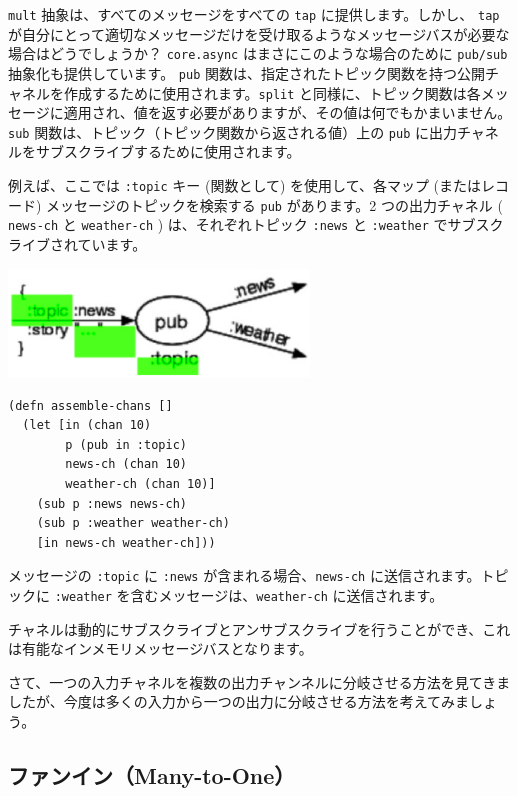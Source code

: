 \texttt{mult} 抽象は、すべてのメッセージをすべての \texttt{tap} に提供します。しかし、 \texttt{tap} が自分にとって適切なメッセージだけを受け取るようなメッセージバスが必要な場合はどうでしょうか？ \texttt{core.async} はまさにこのような場合のために \texttt{pub/sub} 抽象化も提供しています。 \texttt{pub} 関数は、指定されたトピック関数を持つ公開チャネルを作成するために使用されます。\texttt{split} と同様に、トピック関数は各メッセージに適用され、値を返す必要がありますが、その値は何でもかまいません。 \texttt{sub} 関数は、トピック（トピック関数から返される値）上の \texttt{pub} に出力チャネルをサブスクライブするために使用されます。

例えば、ここでは \texttt{:topic} キー (関数として) を使用して、各マップ (またはレコード) メッセージのトピックを検索する \texttt{pub} があります。2 つの出力チャネル ( \texttt{news-ch} と \texttt{weather-ch} ) は、それぞれトピック \texttt{:news} と \texttt{:weather} でサブスクライブされています。

\includegraphics[width=8cm]{fig_06_005.eps}

\begin{lstlisting}[numbers=none]
(defn assemble-chans []
  (let [in (chan 10)
        p (pub in :topic)
        news-ch (chan 10)
        weather-ch (chan 10)]
    (sub p :news news-ch)
    (sub p :weather weather-ch)
    [in news-ch weather-ch]))
\end{lstlisting}

メッセージの \texttt{:topic} に \texttt{:news} が含まれる場合、\texttt{news-ch} に送信されます。トピックに \texttt{:weather} を含むメッセージは、\texttt{weather-ch} に送信されます。

チャネルは動的にサブスクライブとアンサブスクライブを行うことができ、これは有能なインメモリメッセージバスとなります。

さて、一つの入力チャネルを複数の出力チャンネルに分岐させる方法を見てきましたが、今度は多くの入力から一つの出力に分岐させる方法を考えてみましょう。

\subsection{ファンイン（Many-to-One）}

